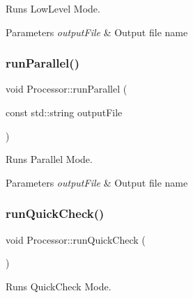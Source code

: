 Runs Low\+Level Mode. 


\begin{DoxyParams}{Parameters}
{\em output\+File} & Output file name \\
\hline
\end{DoxyParams}
\mbox{\label{class_processor_a32965f4a6587e9bf54eeeb11de43a4ad}} 
\subsubsection{\texorpdfstring{run\+Parallel()}{runParallel()}}
{\footnotesize\ttfamily void Processor\+::run\+Parallel (\begin{DoxyParamCaption}\item[{const std\+::string}]{output\+File }\end{DoxyParamCaption})\hspace{0.3cm}{\ttfamily [private]}}



Runs Parallel Mode. 


\begin{DoxyParams}{Parameters}
{\em output\+File} & Output file name \\
\hline
\end{DoxyParams}
\mbox{\label{class_processor_aa04640b32910d2daae25306f35ddcad8}} 
\subsubsection{\texorpdfstring{run\+Quick\+Check()}{runQuickCheck()}}
{\footnotesize\ttfamily void Processor\+::run\+Quick\+Check (\begin{DoxyParamCaption}{ }\end{DoxyParamCaption})\hspace{0.3cm}{\ttfamily [private]}}



Runs Quick\+Check Mode. 

\mbox{\label{class_processor_adf50ef4f51094892e979ebd7cd15af04}} 
